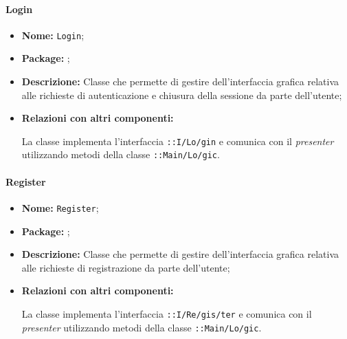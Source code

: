\paragraph{Login}
\begin{flushleft}
\begin{itemize}
\item \textbf{Nome:} \texttt{Login};
\item \textbf{Package:} \texttt{\viewUser{}};
\item \textbf{Descrizione:} Classe che permette di gestire dell'interfaccia grafica relativa alle richieste di autenticazione e chiusura della sessione da parte dell'utente;
\item \textbf{Relazioni con altri componenti:}
\begin{sloppypar}
La classe implementa l'interfaccia \texttt{\iViewUser{}::I\fshyp{}Lo\fshyp{}gin} e comunica con il \textit{presenter} utilizzando metodi della classe \texttt{\logicUser{}::Main\fshyp{}Lo\fshyp{}gic}.
\end{sloppypar}
\end{itemize}
\end{flushleft}

\paragraph{Register}
\begin{flushleft}
\begin{itemize}
\item \textbf{Nome:} \texttt{Register};
\item \textbf{Package:} \texttt{\viewUser{}};
\item \textbf{Descrizione:} Classe che permette di gestire dell'interfaccia grafica relativa alle richieste di registrazione da parte dell'utente;
\item \textbf{Relazioni con altri componenti:}
\begin{sloppypar}
La classe implementa l'interfaccia \texttt{\iViewUser{}::I\fshyp{}Re\fshyp{}gis\fshyp{}ter} e comunica con il \textit{presenter} utilizzando metodi della classe \texttt{\logicUser{}::Main\fshyp{}Lo\fshyp{}gic}.
\end{sloppypar}
\end{itemize}
\end{flushleft}

